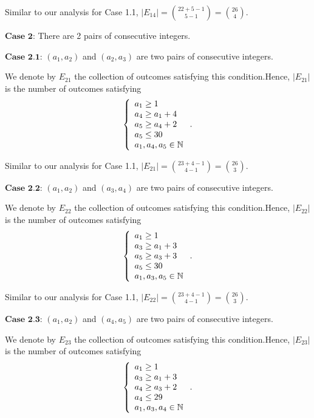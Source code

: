 \begin{enumerate}
 Similar to our analysis for Case 1.1,  $| E_{14} | = \binom{22 + 5 - 1}{5 - 1} = \binom{26}{4}$.

 $\textbf{Case 2}$: There are 2 pairs of consecutive integers.

 $\textbf{Case 2.1}$: $\left( a_1 , a_2 \right)$ and $\left( a_2 , a_3 \right)$ are two pairs of consecutive integers.

 We denote by $E_{21}$ the collection of outcomes satisfying this condition.Hence, $| E_{21} |$ is the number of outcomes satisfying
 \[ \left\{ \begin{array}{l} a_1 \geq 1 \\ a_4 \geq a_1 + 4 \\ a_5 \geq a_4 + 2 \\ a_5 \leq 30 \\ a_1, a_4, a_5 \in \Bbb N \end{array} \right.. \]

 Similar to our analysis for Case 1.1,  $| E_{21} | = \binom{23 + 4 - 1}{4 - 1} = \binom{26}{3}$.

 $\textbf{Case 2.2}$: $\left( a_1 , a_2 \right)$ and $\left( a_3 , a_4 \right)$ are two pairs of consecutive integers.

 We denote by $E_{22}$ the collection of outcomes satisfying this condition.Hence, $| E_{22} |$ is the number of outcomes satisfying
 \[ \left\{ \begin{array}{l} a_1 \geq 1 \\ a_3 \geq a_1 + 3 \\ a_5 \geq a_3 + 3 \\ a_5 \leq 30 \\ a_1, a_3, a_5 \in \Bbb N \end{array} \right.. \]

 Similar to our analysis for Case 1.1,  $| E_{22} | = \binom{23 + 4 - 1}{4 - 1} = \binom{26}{3}$.

 $\textbf{Case 2.3}$: $\left( a_1 , a_2 \right)$ and $\left( a_4 , a_5 \right)$ are two pairs of consecutive integers.

 We denote by $E_{23}$ the collection of outcomes satisfying this condition.Hence, $| E_{23} |$ is the number of outcomes satisfying
 \[ \left\{ \begin{array}{l} a_1 \geq 1 \\ a_3 \geq a_1 + 3 \\ a_4 \geq a_3 + 2 \\ a_4 \leq 29 \\ a_1, a_3, a_4 \in \Bbb N \end{array} \right.. \]


\end{enumerate}
